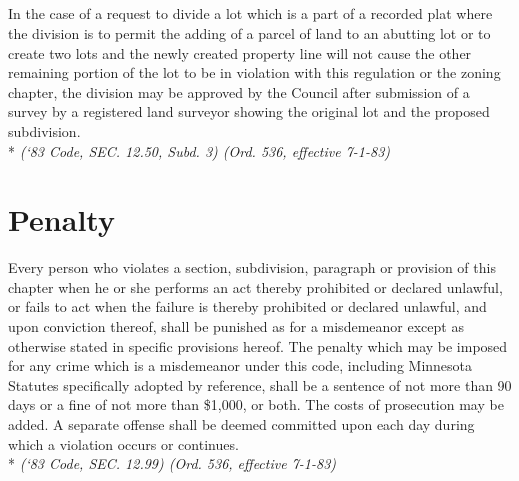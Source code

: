 \subsection{}
In the case of a request to divide a lot which is a part of a recorded plat where the division is to permit the adding of a parcel of land to an abutting lot or to create two lots and the newly created property line will not cause the other remaining portion of the lot to be in violation with this regulation or the zoning chapter, the division may be approved by the Council after submission of a survey by a registered land surveyor showing the original lot and the proposed subdivision.\\*
\emph{(‘83 Code, SEC. 12.50, Subd. 3)  (Ord. 536, effective 7-1-83)}

\setcounter{section}{98}
\section{Penalty}
Every person who violates a section, subdivision, paragraph or provision of this chapter when he or she performs an act thereby prohibited or declared unlawful, or fails to act when the failure is thereby prohibited or declared unlawful, and upon conviction thereof, shall be punished as for a misdemeanor except as otherwise stated in specific provisions hereof. The penalty which may be imposed for any crime which is a misdemeanor under this code, including Minnesota Statutes specifically adopted by reference, shall be a sentence of not more than 90 days or a fine of not more than \$1,000, or both. The costs of prosecution may be added. A separate offense shall be deemed committed upon each day during which a violation occurs or continues.\\*
\emph{(‘83 Code, SEC. 12.99)  (Ord. 536, effective 7-1-83)}
